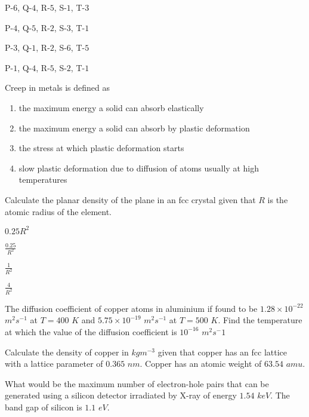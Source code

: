 \hfill{}
\begin{enumerate}
\begin{multicols}{2}
\item P-$6$, Q-$4$, R-$5$, S-$1$, T-$3$
\item P-$4$, Q-$5$, R-$2$, S-$3$, T-$1$
\item P-$3$, Q-$1$, R-$2$, S-$6$, T-$5$
\item P-$1$, Q-$4$, R-$5$, S-$2$, T-$1$
\end{multicols}
\end{enumerate}

\item Creep in metals is defined as

\hfill{}
\begin{enumerate}
\item the maximum energy a solid can absorb elastically
\item the maximum energy a solid can absorb by plastic deformation
\item the stress at which plastic deformation starts
\item slow plastic deformation due to diffusion of atoms usually at high temperatures 
\end{enumerate}

\item Calculate the planar density of the  plane in an fcc crystal given that $R$ is the atomic radius of the element.

\hfill{}
\begin{enumerate}
\begin{multicols}{4}
\item $0.25R^2$
\item $\frac{0.25}{R^2}$
\item $\frac{1}{R^2}$
\item $\frac{4}{R^2}$
\end{multicols}
\end{enumerate}

\item The diffusion coefficient of copper atoms in aluminium if found to be $1.28\times 10^{-22}$ $m^2s^{-1}$ at $T=400$ $K$ and $5.75\times 10^{-19}$ $m^2s^{-1}$ at $T=500$ $K$. Find the temperature  at which the value of the diffusion coefficient is $10^{-16}$ $m^2s^-1$

\hfill{}

\item Calculate the density of copper in $kgm^{-3}$ given that copper has an fcc lattice with a lattice parameter of $0.365$ $nm$. Copper has an atomic weight of $63.54$ $amu$.

\hfill{}

\item What would be the maximum number of electron-hole pairs that can be generated using a silicon detector irradiated by X-ray of energy $1.54$ $keV$. The band gap of silicon is $1.1$ $eV$.

\hfill{}



